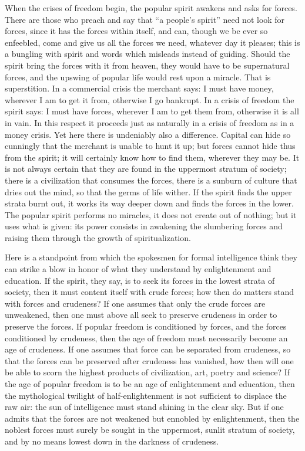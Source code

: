 \documentclass[12pt,a4paper,openany]{book}
\newcommand{\opage}[1]{\marginnote{\footnotesize\textit{[#1]}}}
\begin{document}
When the crises of freedom begin, the popular spirit awakens
and asks for forces. There are those who
preach and say that ``a people's spirit'' need not look
for forces, since it has the forces within itself,
and can, though we be ever so enfeebled, come
and give us all the forces we need, whatever day it
pleases; this is a bungling with spirit and words which misleads
instead of guiding. Should the spirit bring
the forces with it from heaven, they would have to be
supernatural forces, and the upswing of popular life would rest
\setcounter{footnote}{0}%
\opage{59}upon a miracle. That is superstition. In a commercial crisis
the merchant says: I must have money, wherever I am
to get it from, otherwise I go bankrupt. In a crisis of freedom
the spirit says: I must have forces, wherever I am
to get them from, otherwise it is all in vain.
In this respect it proceeds just as naturally in a
crisis of freedom as in a money crisis. Yet here there is undeniably
also a difference. Capital can hide so
cunningly that the merchant is unable to hunt it
up; but forces cannot hide thus
from the spirit; it will certainly know how to find them, wherever they
may be. It is not always certain that they are found in the uppermost
stratum of society; there is a civilization that consumes
the forces, there is a sunburn of culture that
dries out the mind, so that the germs of life wither. If the
spirit finds the upper strata burnt out, it works its way
deeper down and finds the forces in the lower. The popular spirit
performs no miracles, it does not create out of nothing;
but it uses what is given: its power consists in
awakening the slumbering forces and raising them through the
growth of spiritualization.

Here is a standpoint from which the spokesmen for
formal intelligence think they can strike a blow
in honor of what they understand by enlightenment and education.
If the spirit, they say, is to seek its forces in the lowest
strata of society, then it must content itself with crude
forces; how then do matters stand with forces
and crudeness? If one assumes that only the crude forces
are unweakened, then one must above all seek to preserve
crudeness in order to preserve the forces. If popular freedom is
conditioned by forces, and the forces conditioned by crudeness,
then the age of freedom must necessarily become an
\setcounter{footnote}{0}%
\opage{60}age of crudeness. If one assumes that force can be separated
from crudeness, so that the forces can be preserved after
crudeness has vanished, how then will one be able to
scorn the highest products of civilization,
art, poetry and science? If the age of popular freedom is to
be an age of enlightenment and education, then the mythological
twilight of half-enlightenment is not sufficient to
displace the raw air: the sun of intelligence must stand
shining in the clear sky. But if one admits
that the forces are not weakened but ennobled by enlightenment,
then the noblest forces must surely be sought in the uppermost,
sunlit stratum of society, and by no means lowest down in
the darkness of crudeness.
\end{document}
